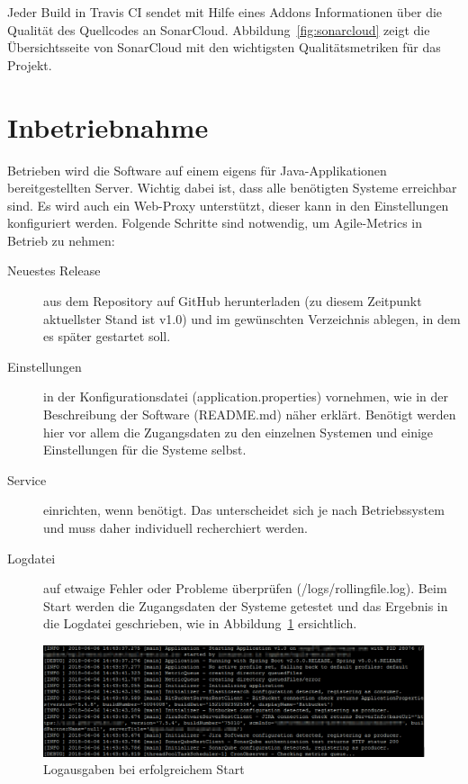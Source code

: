 Jeder Build in Travis CI sendet mit Hilfe eines Addons Informationen über die Qualität des Quellcodes an SonarCloud.
Abbildung~\ref{fig:sonarcloud} zeigt die Übersichtsseite von SonarCloud mit den wichtigsten Qualitätsmetriken für das Projekt.

\newpage
\section{Inbetriebnahme}

Betrieben wird die Software auf einem eigens für Java-Applikationen bereitgestellten Server. 
Wichtig dabei ist, dass alle benötigten Systeme erreichbar sind. 
Es wird auch ein Web-Proxy unterstützt, dieser kann in den Einstellungen konfiguriert werden.
Folgende Schritte sind notwendig, um Agile-Metrics in Betrieb zu nehmen:
\begin{description}
    \item[Neuestes Release] aus dem Repository auf GitHub herunterladen (zu diesem Zeitpunkt aktuellster Stand ist v1.0) und im gewünschten Verzeichnis ablegen, in dem es später gestartet soll.
    \item[Einstellungen] in der Konfigurationsdatei (application.properties) vornehmen, wie in der Beschreibung der Software (README.md) näher erklärt. Benötigt werden hier vor allem die Zugangsdaten zu den einzelnen Systemen und einige Einstellungen für die Systeme selbst.
    \item[Service] einrichten, wenn benötigt. Das unterscheidet sich je nach Betriebssystem und muss daher individuell recherchiert werden.
    \item[Logdatei] auf etwaige Fehler oder Probleme überprüfen (/logs/rollingfile.log). Beim Start werden die Zugangsdaten der Systeme getestet und das Ergebnis in die Logdatei geschrieben, wie in Abbildung~\ref{fig:successful-start} ersichtlich.
\end{description}

\begin{savenotes}
    \begin{figure}[H] 
        \centering
            \includegraphics[width=1.0\textwidth]{img/successful-start.png}
        \caption{Logausgaben bei erfolgreichem Start}\label{fig:successful-start}
    \end{figure}
\end{savenotes}

